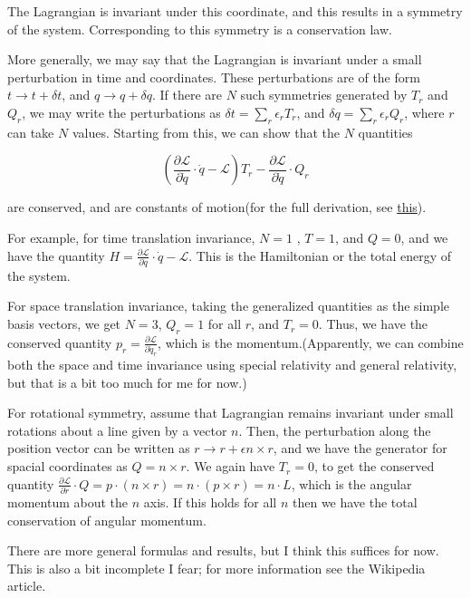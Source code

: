 \documentclass[11pt]{book}
\newcommand{\lagrangian}{\mathcal{L}}
\begin{document}
The Lagrangian is invariant under this coordinate, and this results in a symmetry of the system. Corresponding to this symmetry is a conservation law. 

More generally, we may say that the Lagrangian is invariant under a small perturbation in time and coordinates. These perturbations are of the form $t \rightarrow t + \delta t$, and $q \rightarrow q + \delta q$. If there are $N$ such symmetries generated by $T_r$ and $Q_r$, we may write the perturbations as $\delta t = \sum_{r}^{} \epsilon_r T_r$, and $\delta q = \sum_{r}^{} \epsilon_r Q_r$, where $r$ can take $N$ values. Starting from this, we can show that the $N$ quantities 

\begin{equation}
\left(\frac{\partial \lagrangian}{\partial \dot q }\cdot \dot q - \lagrangian \right) T_r - \frac{\partial \lagrangian}{\partial \dot q} \cdot Q_r 
\end{equation}

are conserved, and are constants of motion(for the full derivation, see \href{https://en.wikipedia.org/wiki/Noether%27s_theorem#Derivations}{this}).

For example, for time translation invariance, $N = 1$ , $T = 1$, and $Q = 0$, and we have the quantity $H = \frac{\partial \lagrangian}{\partial \dot q}\cdot \dot q - \lagrangian$. This is the Hamiltonian or the total  energy of the system.

For space translation invariance, taking the generalized quantities as the simple basis vectors, we get $N = 3$, $Q_r = 1$ for all $r$, and $T_r = 0$. Thus, we have the conserved quantity $p_r = \frac{\partial \lagrangian}{\partial \dot q_r}$, which is the momentum.(Apparently, we can combine both the space and time invariance using special relativity and general relativity, but that is a bit too much for me for now.)

For rotational symmetry, assume that Lagrangian remains invariant under small rotations about a line given by a vector $n$. Then, the perturbation along the position vector can be written as $r \rightarrow r + \epsilon n \times r$, and we have the generator for spacial coordinates as $Q = n \times r$. We again have $T_r = 0$, to get the conserved quantity $\frac{\partial \lagrangian}{\partial \dot r}\cdot Q = p \cdot (n \times r) = n \cdot (p \times r) = n \cdot L$, which is the angular momentum about the $n$ axis. If this holds for all $n$ then we have the total conservation of angular momentum.

There are more general formulas and results, but I think this suffices for now. This is also a bit incomplete I fear; for more information see the Wikipedia article.
\end{document}
